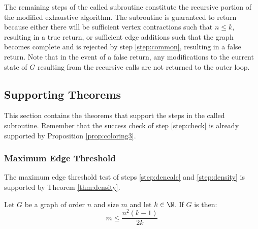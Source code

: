 The remaining steps of the called subroutine constitute the recursive portion of the modified exhaustive algorithm.
The subroutine is guaranteed to return because either there will be sufficient vertex contractions such that \(n\le
k\), resulting in a true return, or sufficient edge additions such that the graph becomes complete and is rejected
by step \ref{step:common}, resulting in a false return.  Note that in the event of a false return, any
modifications to the current state of \(G\) resulting from the recursive calls are not returned to the outer loop.

\clearpage

\subsection{Supporting Theorems}

This section contains the theorems that support the steps in the called subroutine.  Remember that the success check
of step \ref{step:check} is already supported by Proposition \ref{prop:coloring3}.

\subsubsection{Maximum Edge Threshold}

The maximum edge threshold test of steps \ref{step:dencalc} and \ref{step:density} is supported by Theorem
\ref{thm:density}.

\begin{theorem}
  \label{thm:density}
  Let \(G\) be a graph of order \(n\) and size \(m\) and let \(k\in\N\).  If \(G\) is  then:
  \[m\le\frac{n^2(k-1)}{2k}\]
\end{theorem}

